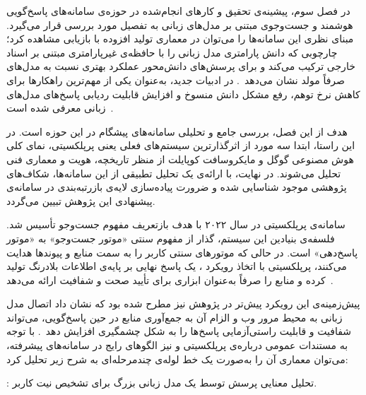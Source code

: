 
در فصل سوم، پیشینه‌ی تحقیق و کارهای انجام‌شده در حوزه‌ی سامانه‌های پاسخ‌گویی هوشمند و جست‌وجوی مبتنی بر مدل‌های زبانی به تفصیل مورد بررسی قرار می‌گیرد. 
مبنای نظری این سامانه‌ها را می‌توان در معماری تولید افزوده با بازیابی مشاهده کرد؛ چارچوبی که دانش پارامتری مدل زبانی را با حافظه‌ی غیرپارامتری مبتنی بر اسناد خارجی ترکیب می‌کند و برای پرسش‌های دانش‌محور عملکرد بهتری نسبت به مدل‌های صرفاً مولد نشان می‌دهد~. در ادبیات جدید،  به‌عنوان یکی از مهم‌ترین راهکارها برای کاهش نرخ توهم، رفع مشکل دانش منسوخ و افزایش قابلیت ردیابی پاسخ‌های مدل‌های زبانی معرفی شده است~.

هدف از این فصل، بررسی جامع و تحلیلی سامانه‌های پیشگام در این حوزه است. در این راستا، ابتدا سه مورد از اثرگذارترین سیستم‌های فعلی یعنی پرپلکسیتی، نمای کلی هوش مصنوعی گوگل و مایکروسافت کوپایلت از منظر تاریخچه، هویت و معماری فنی تحلیل می‌شوند. 
در نهایت، با ارائه‌ی یک تحلیل تطبیقی از این سامانه‌ها، شکاف‌های پژوهشی موجود شناسایی شده و ضرورت پیاده‌سازی لایه‌ی بازرتبه‌بندی در سامانه‌ی پیشنهادی این پژوهش تبیین می‌گردد.


سامانه‌ی پرپلکسیتی در سال ۲۰۲۲ با هدف بازتعریف مفهوم جست‌وجو تأسیس شد. فلسفه‌ی بنیادین این سیستم، گذار از مفهوم سنتی «موتور جست‌وجو» به «موتور پاسخ‌دهی» است. در حالی که موتورهای سنتی کاربر را به سمت منابع و پیوندها هدایت می‌کنند، پرپلکسیتی با اتخاذ رویکرد ، یک پاسخ نهایی بر پایه‌ی اطلاعات بلادرنگ تولید کرده و منابع را صرفاً به‌عنوان ابزاری برای تأیید صحت و شفافیت ارائه می‌دهد~.

پیش‌زمینه‌ی این رویکرد پیش‌تر در پژوهش  نیز مطرح شده بود که نشان داد اتصال مدل زبانی به محیط مرور وب و الزام آن به جمع‌آوری منابع در حین پاسخ‌گویی، می‌تواند شفافیت و قابلیت راستی‌آزمایی پاسخ‌ها را به شکل چشمگیری افزایش دهد~. با توجه به مستندات عمومی درباره‌ی پرپلکسیتی و نیز الگوهای رایج در سامانه‌های  پیشرفته، می‌توان معماری آن را به‌صورت یک خط لوله‌ی چندمرحله‌ای به شرح زیر تحلیل کرد:


: تحلیل معنایی پرسش توسط یک مدل زبانی بزرگ برای تشخیص نیت کاربر.

